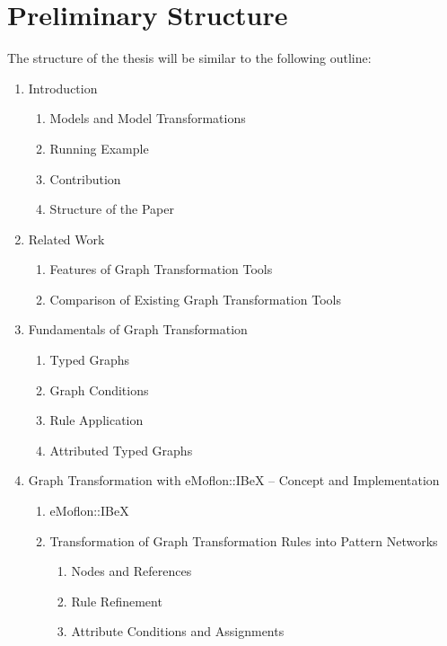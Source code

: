 \chapter{Preliminary Structure}
\label{preliminary-structure}
The structure of the thesis will be similar to the following outline:

\renewcommand{\labelenumii}{\theenumii.}
\renewcommand{\theenumii}{\theenumi.\arabic{enumii}}

\renewcommand{\labelenumiii}{\theenumiii.}
\renewcommand{\theenumiii}{\theenumii.\arabic{enumiii}}

\begin{enumerate}
	\item Introduction
		\begin{enumerate}
			\item Models and Model Transformations
			\item Running Example
			\item Contribution
			\item Structure of the Paper
		\end{enumerate}
	\item Related Work
		\begin{enumerate}
			\item Features of Graph Transformation Tools
			\item Comparison of Existing Graph Transformation Tools
		\end{enumerate}
	\item Fundamentals of Graph Transformation
		\begin{enumerate}
			\item Typed Graphs
			\item Graph Conditions
			\item Rule Application
			\item Attributed Typed Graphs
		\end{enumerate}
	\item Graph Transformation with eMoflon::IBeX -- Concept and Implementation
		\begin{enumerate}
			\item eMoflon::IBeX
			\item Transformation of Graph Transformation Rules into Pattern Networks
				\begin{enumerate}
					\item Nodes and References
					\item Rule Refinement 
					\item Attribute Conditions and Assignments

\end{enumerate}
\end{enumerate}
\end{enumerate}
